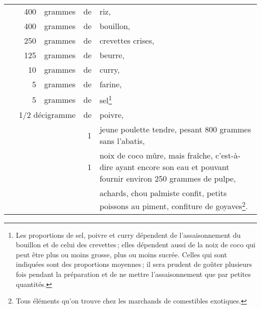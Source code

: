 \footnotesize
\begin{longtable}{rrrrrp{18em}}
  & \hspace{2em} & 400 & grammes & de & riz,                                                              \\
  & \hspace{2em} & 400 & grammes & de & bouillon,                                                         \\
  & \hspace{2em} & 250 & grammes & de & crevettes crises,                                                 \\
  & \hspace{2em} & 125 & grammes & de & beurre,                                                           \\
  & \hspace{2em} &  10 & grammes & de & curry,                                                            \\
  & \hspace{2em} &   5 & grammes & de & farine,                                                           \\
  & \hspace{2em} &   5 & grammes & de & sel\footnote{Les proportions de sel, poivre et curry
                                            dépendent de l'assaisonnement du bouillon et de celui
                                            des crevettes ; elles dépendent aussi de la noix de
                                            coco qui peut être plus ou moins grosse, plus ou moins
                                            sucrée. Celles qui sont indiquées sont des proportions
                                            moyennes ; il sera prudent de goûter plusieurs fois
                                            pendant la préparation et de ne mettre l'assaisonnement
                                            que par petites quantités.}                                   \\
  & \multicolumn{3}{r}{1/2 décigramme} & de & poivre,                                                     \\
  &              &     &         &  1 & jeune poulette tendre, pesant 800 grammes sans l'abatis,          \\
  &              &     &         &  1 & noix de coco mûre, mais fraîche, c'est-à-dire ayant encore
                                        son eau et pouvant fournir environ 250 grammes de pulpe,          \\
  &              &     &         &    & achards, chou palmiste confit, petits poissons au piment,
                                        confiture de goyaves\footnote{Tous éléments qu'on trouve
                                        chez les marchands de comestibles exotiques.}.                    \\
\end{longtable}
\normalsize

